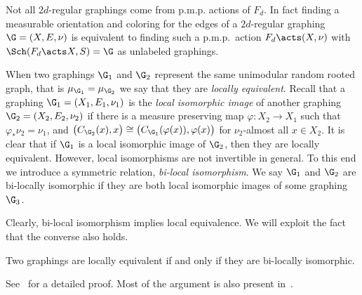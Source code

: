 Not all $2d$-regular graphings come from p.m.p. actions of $F_d$. In fact finding a measurable orientation and coloring for the edges of a $2d$-regular graphing $\G=(X,E, \nu)$ is equivalent to finding such a p.m.p.\ action $F_d \acts (X, \nu)$ with $\Sch(F_d \acts X, S)=\G$ as unlabeled graphings.

When two graphings $\G_1$ and $\G_2$ represent the same unimodular random rooted graph, that is $\mu_{\G_1} = \mu_{\G_2}$ we say that they are \emph{locally equivalent}. Recall that a graphing $\G_1=(X_1, E_1, \nu_1)$ is the \emph{local isomorphic image} of another graphing $\G_2=(X_2, E_2, \nu_2)$ if there is a measure preserving map $\varphi: X_2 \to X_1$ such that $\varphi_{*}\nu_2=\nu_1$, and $\big(C_{\G_2}(x),x\big) \cong \big(C_{\G_1}(\varphi(x)),\varphi(x)\big)$ for $\nu_2$-almost all $x \in X_2$. It is clear that if $\G_1$ is a local isomorphic image of $\G_2$, then they are locally equivalent. However, local isomorphisms are not invertible in general. To this end we introduce a symmetric relation, \emph{bi-local isomorphism}. We say $\G_1$ and $\G_2$ are bi-locally isomorphic if they are both local isomorphic images of some graphing $\G_3$.

Clearly, bi-local isomorphism implies local equivalence. We will exploit the fact that the converse also holds.

\begin{theo}\label{theorem:bilocal}
Two graphings are locally equivalent if and only if they are bi-locally isomorphic.
\end{theo}

See~\cite[Theorem~18.59]{lovasz2012large} for a detailed proof. Most of the argument is also present in~\cite{hatami2014limits}.


